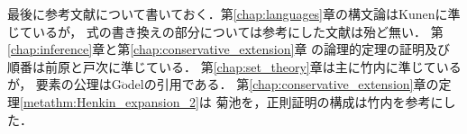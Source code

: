 	最後に参考文献について書いておく．第\ref{chap:languages}章の構文論はKunen\cite{Kunen}に準じているが，
	式の書き換えの部分については参考にした文献は殆ど無い．
	第\ref{chap:inference}章と第\ref{chap:conservative_extension}章
	の論理的定理の証明及び順番は前原\cite{Maehara}と戸次\cite{Bekki}に準じている．
	第\ref{chap:set_theory}章は主に竹内\cite{TakeuchiSet}に準じているが，
	要素の公理はG$\ddot{\mbox{o}}$del\cite{Godel}の引用である．
	第\ref{chap:conservative_extension}章の定理\ref{metathm:Henkin_expansion_2}は
	菊池\cite{Kikuchi}を，正則証明の構成は竹内\cite{TakeuchiProof}を参考にした．